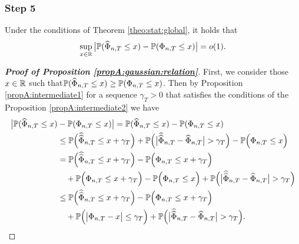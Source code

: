 \subsubsection*{Step 5}
\begin{propA}\label{propA:gaussian:relation}
Under the conditions of Theorem \ref{theo:stat:global}, it holds that 
\begin{equation}\label{eqA:gaussian:relation}
\sup_{x \in \mathbb{R}} \big| \mathbb{P}(\widehat{\Phi}_{n, T} \le x) - \mathbb{P}(\Phi_{n,T} \le x) \big| = o(1).
\end{equation}
\end{propA}
\begin{proof}[\textnormal{\textbf{Proof of Proposition \ref{propA:gaussian:relation}}}] 
First, we consider those $x\in \mathbb{R}$ such that\linebreak $\mathbb{P}(\widehat{\Phi}_{n,T} \le x) \geq \mathbb{P}(\Phi_{n, T} \le x)$. Then by Proposition \ref{propA:intermediate1} for a sequence $\gamma_{T}>0$ that satisfies the conditions of the Proposition \ref{propA:intermediate2} we have
\begin{align*}
\big| \mathbb{P}(\widehat{\Phi}_{n, T} \le x) &- \mathbb{P}(\Phi_{n,T} \le x) \big| = \mathbb{P}(\widehat{\Phi}_{n, T} \le x) - \mathbb{P}(\Phi_{n,T} \le x)  \\
&\le \mathbb{P}\Big(\widehat{\widehat{\Phi}}_{n,T} \le x + \gamma_{T}\Big) + \mathbb{P} \Big(\big|\widehat{\widehat{\Phi}}_{n,T} - \widehat{\Phi}_{n,T}\big| > \gamma_{T} \Big)   - \mathbb{P}\Big(\Phi_{n,T} \le x\Big)  \\
&= \mathbb{P}\Big(\widehat{\widehat{\Phi}}_{n,T} \le x + \gamma_{T}\Big) - \mathbb{P}\Big(\Phi_{n,T} \le x + \gamma_{T}\Big)  \\
& \quad +  \mathbb{P}\Big(\Phi_{n,T} \le x + \gamma_{T}\Big)   - \mathbb{P}\Big(\Phi_{n,T} \le x\Big) + \mathbb{P} \Big(\big|\widehat{\widehat{\Phi}}_{n,T} - \widehat{\Phi}_{n,T}\big| > \gamma_{T} \Big) \\
&\le \mathbb{P}\Big(\widehat{\widehat{\Phi}}_{n,T} \le x + \gamma_{T}\Big) - \mathbb{P}\Big(\Phi_{n,T} \le x + \gamma_{T}\Big) \\
&\quad + \mathbb{P}\Big(\big|\Phi_{n,T} - x \big| \le \gamma_{T}\Big) + \mathbb{P} \Big(\big|\widehat{\widehat{\Phi}}_{n,T} - \widehat{\Phi}_{n,T}\big| > \gamma_{T} \Big).
\end{align*}


\end{proof}
